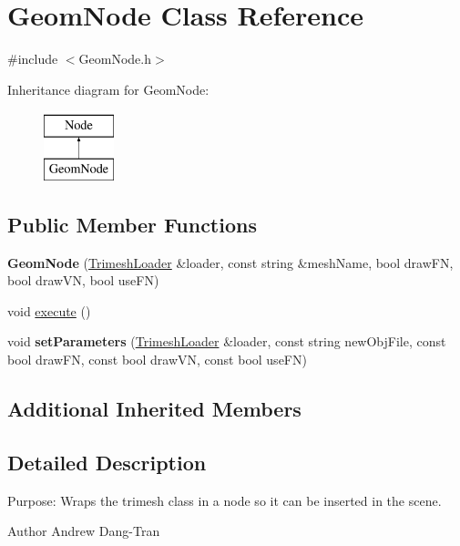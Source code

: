 \hypertarget{classGeomNode}{\section{Geom\-Node Class Reference}
\label{classGeomNode}
}


{\ttfamily \#include $<$Geom\-Node.\-h$>$}

Inheritance diagram for Geom\-Node\-:\begin{figure}[H]
\begin{center}
\leavevmode
\includegraphics[height=2.000000cm]{classGeomNode}
\end{center}
\end{figure}
\subsection*{Public Member Functions}
\begin{DoxyCompactItemize}
\item 
\hypertarget{classGeomNode_a1474347796226f324cc7b1bc5a1eeae7}{{\bfseries Geom\-Node} (\hyperlink{classTrimeshLoader}{Trimesh\-Loader} \&loader, const string \&mesh\-Name, bool draw\-F\-N, bool draw\-V\-N, bool use\-F\-N)}\label{classGeomNode_a1474347796226f324cc7b1bc5a1eeae7}

\item 
void \hyperlink{classGeomNode_a9755aa5e3bbe2b746244405244064681}{execute} ()
\item 
\hypertarget{classGeomNode_af5bef5d3671dee78640b64109ed6de6c}{void {\bfseries set\-Parameters} (\hyperlink{classTrimeshLoader}{Trimesh\-Loader} \&loader, const string new\-Obj\-File, const bool draw\-F\-N, const bool draw\-V\-N, const bool use\-F\-N)}\label{classGeomNode_af5bef5d3671dee78640b64109ed6de6c}

\end{DoxyCompactItemize}
\subsection*{Additional Inherited Members}


\subsection{Detailed Description}
Purpose\-: Wraps the trimesh class in a node so it can be inserted in the scene. \begin{DoxyAuthor}{Author}
Andrew Dang-\/\-Tran 
\end{DoxyAuthor}


